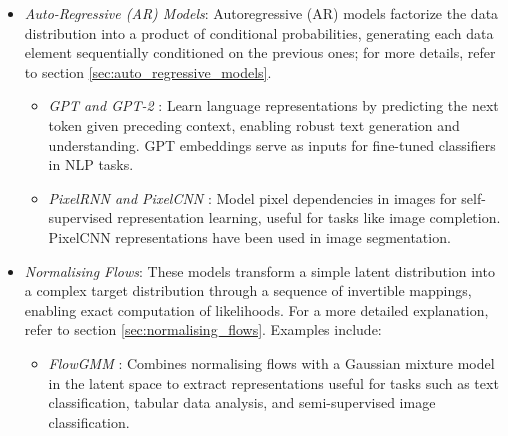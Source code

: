 \begin{itemize}
    \item \emph{Auto-Regressive (AR) Models}: Autoregressive (AR) models factorize the data distribution into a product of conditional probabilities, generating each data element sequentially conditioned on the previous ones; for more details, refer to section \ref{sec:auto_regressive_models}.
    \begin{itemize}
        \item \emph{GPT and GPT-2} \citep{radford2019language}: Learn language representations by predicting the next token given preceding context, enabling robust text generation and understanding. GPT embeddings serve as inputs for fine-tuned classifiers in NLP tasks.
        \item \emph{PixelRNN and PixelCNN} \citep{oord2016pixel}: Model pixel dependencies in images for self-supervised representation learning, useful for tasks like image completion. PixelCNN representations have been used in image segmentation.
    \end{itemize}

    \item \emph{Normalising Flows}: These models transform a simple latent distribution into a complex target distribution through a sequence of invertible mappings, enabling exact computation of likelihoods. For a more detailed explanation, refer to section \ref{sec:normalising_flows}. Examples include:
\begin{itemize}
    \item \emph{FlowGMM} \citep{izmailov2021flowgmm}: Combines normalising flows with a Gaussian mixture model in the latent space to extract representations useful for tasks such as text classification, tabular data analysis, and semi-supervised image classification.
\end{itemize}


\end{itemize}

